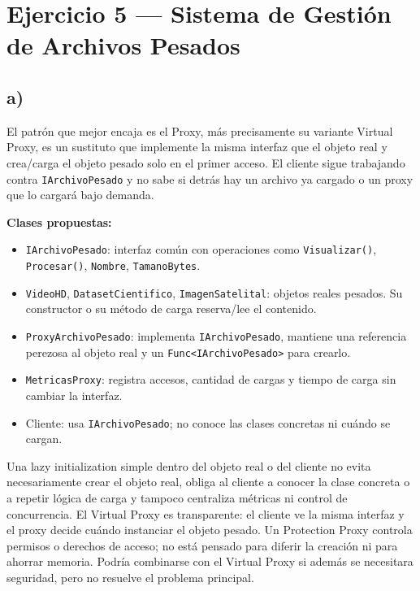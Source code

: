 \documentclass[11pt,a4paper]{article}
\begin{document}

\section*{Ejercicio 5 — Sistema de Gestión de Archivos Pesados}

\subsection*{a)}

El patrón que mejor encaja es el Proxy, más precisamente su variante Virtual Proxy, es un sustituto que implemente la misma interfaz que el objeto real y crea/carga el objeto pesado solo en el primer acceso. El cliente sigue trabajando contra \texttt{IArchivoPesado} y no sabe si detrás hay un archivo ya cargado o un proxy que lo cargará bajo demanda.

\textbf{Clases propuestas:}
\begin{itemize}
    \item \texttt{IArchivoPesado}: interfaz común con operaciones como \texttt{Visualizar()}, \texttt{Procesar()}, \texttt{Nombre}, \texttt{TamanoBytes}.
    \item \texttt{VideoHD}, \texttt{DatasetCientifico}, \texttt{ImagenSatelital}: objetos reales pesados. Su constructor o su método de carga reserva/lee el contenido.
    \item \texttt{ProxyArchivoPesado}: implementa \texttt{IArchivoPesado}, mantiene una referencia perezosa al objeto real y un \texttt{Func<IArchivoPesado>} para crearlo.
    \item \texttt{MetricasProxy}: registra accesos, cantidad de cargas y tiempo de carga sin cambiar la interfaz.
    \item Cliente: usa \texttt{IArchivoPesado}; no conoce las clases concretas ni cuándo se cargan.
\end{itemize}

Una lazy initialization simple dentro del objeto real o del cliente no evita necesariamente crear el objeto real, obliga al cliente a conocer la clase concreta o a repetir lógica de carga y tampoco centraliza métricas ni control de concurrencia. El Virtual Proxy es transparente: el cliente ve la misma interfaz y el proxy decide cuándo instanciar el objeto pesado. Un Protection Proxy controla permisos o derechos de acceso; no está pensado para diferir la creación ni para ahorrar memoria. Podría combinarse con el Virtual Proxy si además se necesitara seguridad, pero no resuelve el problema principal.
\end{document}
